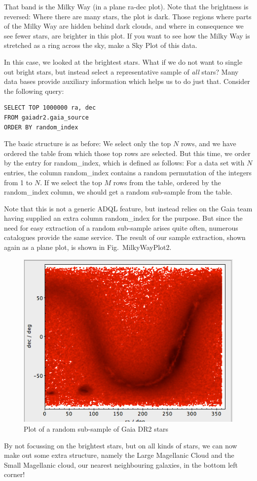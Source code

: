 \documentclass[twocolumn,apj]{openjournal}
\begin{document}
That band is the Milky Way (in a plane ra-dec plot). Note that the brightness is reversed: Where there are many stars, the plot is dark. Those regions where parts of the Milky Way are hidden behind dark clouds, and where in consequence we see fewer stars, are brighter in this plot. If you want to see how the Milky Way is stretched as a ring across the sky, make a Sky Plot of this data.

In this case, we looked at the brightest stars. What if we do not want to single out bright stars, but instead select a representative sample of {\em all} stars? Many data bases provide auxiliary information which helps us to do just that. Consider the following query:
\begin{lstlisting}
SELECT TOP 1000000 ra, dec
FROM gaiadr2.gaia_source
ORDER BY random_index
\end{lstlisting}
The basic structure is as before: We select only the top $N$ rows, and we have ordered the table from which those top rows are selected. But this time, we order by the entry for random\_index, which is defined as follows: For a data set with $N$ entries, the column random\_index contains a random permutation of the integers from 1 to $N$. If we select the top $M$ rows from the table, ordered by the random\_index column, we should get a random sub-sample from the table. 

Note that this is not a generic ADQL feature, but instead relies on the Gaia team having supplied an extra column random\_index for the purpose. But since the need for easy extraction of a random sub-sample arises quite often, numerous catalogues provide the same service. The result of our sample extraction, shown again as a plane plot, is shown in Fig.~{MilkyWayPlot2}.
\begin{figure}[htbp]
\begin{center}
\includegraphics[width=\linewidth]{milky-way-plot2.jpg}
\caption{Plot of a random sub-sample of Gaia DR2 stars}
\label{MilkyWayPlot2}
\end{center}
\end{figure}
By not focussing on the brightest stars, but on all kinds of stars, we can now make out some extra structure, namely the Large Magellanic Cloud and the Small Magellanic cloud, our nearest neighbouring galaxies, in the bottom left corner!
\end{document}
